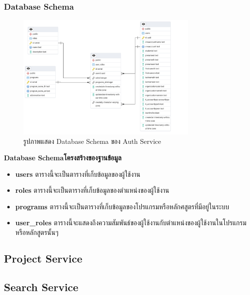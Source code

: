 \subsubsection{Database Schema}
\begin{figure}[H]
  \centering
  \includegraphics[width=0.8\textwidth]{pictures/auth_db.png}
  \caption{รูปภาพแสดง Database Schema ของ Auth Service}
  \label{fig:auth_service}
\end{figure}
\textbf{\ifenglish Database Schema\else โครงสร้างของฐานข้อมูล\fi}
\begin{itemize}
  \item \textbf{users} ตารางนี้จะเป็นตารางที่เก็บข้อมูลของผู้ใช้งาน 
  \item \textbf{roles} ตารางนี้จะเป็นตารางที่เก็บข้อมูลของตำแหน่งของผู้ใช้งาน
  \item \textbf{programs} ตารางนี้จะเป็นตารางที่เก็บข้อมูลของโปรแกรมหรือหลักศสูตรที่มีอยู่ในระบบ
  \item \textbf{user\_roles} ตารางนี้จะแสดงถึงความสัมพันธ์ของผู้ใช้งานกับตำแหน่งของผู้ใช้งานในโปรแกรมหรือหลักสูตรนั้นๆ
\end{itemize}
\subsection{Project Service}
\subsection{Search Service}
